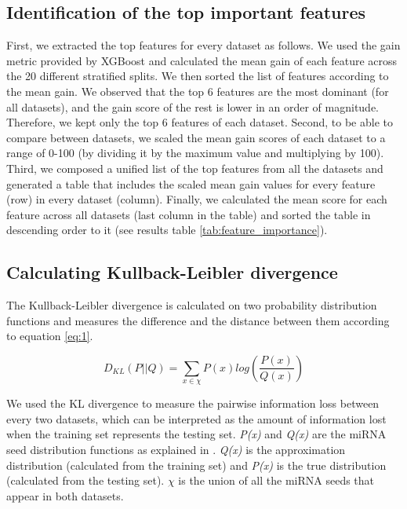 \documentclass{bmcart}
\begin{document}
\subsection*{Identification of the top important features} \label{ident_top_features}
First, we extracted the top features for every dataset as follows. We used the gain metric provided by XGBoost and calculated the mean gain of each feature across the 20 different stratified splits. We then sorted the list of features according to the mean gain. We observed that the top 6 features are the most dominant (for all datasets), and the gain score of the rest is lower in an order of magnitude. Therefore, we kept only the top 6 features of each dataset.  
Second, to be able to compare between datasets, we scaled the mean gain scores of each dataset to a range of 0-100 (by dividing it by the maximum value and multiplying by 100). 
Third, we composed a unified list of the top features from all the datasets and generated a table that includes the scaled mean gain values for every feature (row) in every dataset (column). Finally, we calculated the mean score for each feature across all datasets (last column in the table) and sorted the table in descending order to it (see results table \ref{tab:feature_importance}).

\subsection*{Calculating Kullback-Leibler divergence}
The Kullback-Leibler divergence is calculated on two probability distribution functions and measures the difference and the distance between them according to equation \ref{eq:1}.

\begin{equation}
 D_{KL} \left (P ||Q \right ) = \sum_{x\in \chi }{P\left ( x \right )log\left ( \frac{P\left ( x \right )}{Q\left ( x \right )} \right )}\label{eq:1}
\end{equation}

We used the KL divergence to measure the pairwise information loss between every two datasets, which can be interpreted as the amount of information lost when the training set represents the testing set. \textit{P(x)} and \textit{Q(x)} are the miRNA seed distribution functions as explained in . \textit{Q(x)} is the approximation distribution (calculated from the training set) and \textit{P(x)} is the true distribution (calculated from the testing set). $\chi$ is the union of all the miRNA seeds that appear in both datasets.
\end{document}
